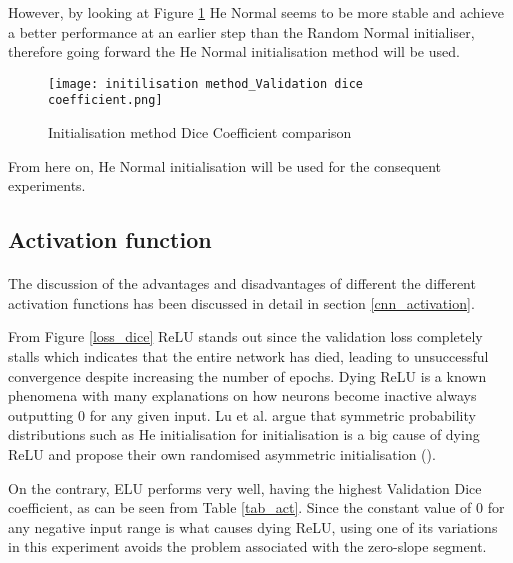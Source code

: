 However, by looking at Figure \ref{init_dice} He Normal seems to be more stable and achieve a better performance at an earlier step than the Random Normal initialiser, therefore going forward the He Normal initialisation method will be used.

\begin{figure}[hbt!]
    \centering
    \texttt{[image: initilisation method\_Validation dice coefficient.png]}
    \caption{Initialisation method Dice Coefficient comparison}
    \label{init_dice}
\end{figure}    

From here on, He Normal initialisation will be used for the consequent experiments.

\subsection{Activation function}
\paragraph{}
The discussion of the advantages and disadvantages of different the different activation functions has been discussed in detail in section \ref{cnn_activation}.

From Figure \ref{loss_dice} \gls{ReLU} stands out since the validation loss completely stalls which indicates that the entire network has died, leading to unsuccessful convergence despite increasing the number of epochs. Dying \gls{ReLU} is a known phenomena with many explanations on how neurons become inactive always outputting $0$ for any given input. Lu et al. argue that symmetric probability distributions such as He initialisation for initialisation is a big cause of dying \gls{ReLU} and propose their own randomised asymmetric initialisation (\cite{Lu_2020}).

On the contrary, \gls{ELU} performs very well, having the highest Validation Dice coefficient, as can be seen from Table \ref{tab_act}. Since the constant value of $0$ for any negative input range is what causes dying \gls{ReLU}, using one of its variations in this experiment avoids the problem associated with the zero-slope segment.

